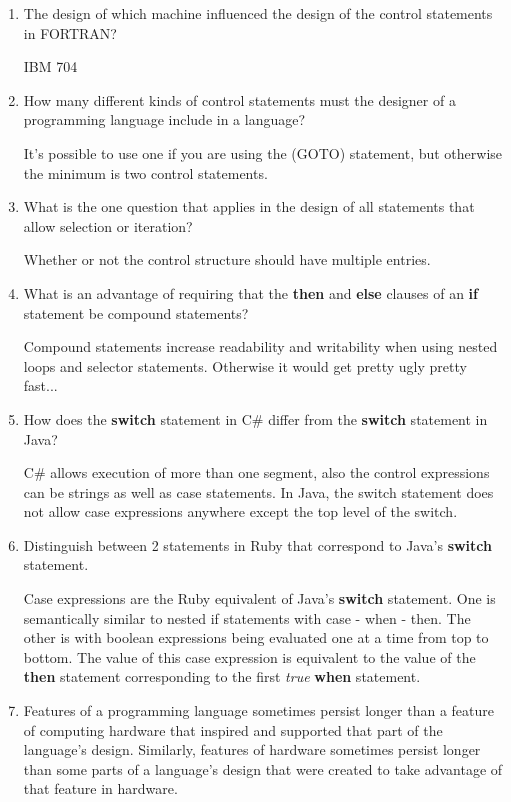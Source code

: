 \begin{enumerate}
  \item The design of which machine influenced the design
    of the control statements in FORTRAN?
    
    IBM 704

  \item How many different kinds of control statements
    must the designer of a programming language include
    in a language?
    
    It's possible to use one if you are using the (GOTO) statement, but otherwise the minimum is two control statements. 

  \item What is the one question that applies in the
    design of all statements that allow selection or
    iteration?
    
    Whether or not the control structure should have multiple entries.

  \item What is an advantage of requiring that
    the \textbf{then} and \textbf{else} clauses of
    an \textbf{if} statement be compound statements?
    
    Compound statements increase readability and writability when using nested loops and selector statements. Otherwise it would get pretty ugly pretty fast...

  \item How does the \textbf{switch} statement in C\#
    differ from the \textbf{switch} statement in Java?
    
    C\# allows execution of more than one segment, also the control expressions can be strings as well as case statements. In Java, the switch statement does not allow case expressions anywhere except the top level of the switch.

  \item Distinguish between 2 statements in Ruby
    that correspond to Java's \textbf{switch} statement.
    
    Case expressions are the Ruby equivalent of Java's \textbf{switch} statement. One is semantically similar to nested if statements with case - when - then. The other is with boolean expressions being evaluated one at a time from top to bottom. The value of this case expression is equivalent to the value of the \textbf{then} statement corresponding to the first \textit{true} \textbf{when} statement. 

  \item Features of a programming language sometimes persist
    longer than a feature of computing hardware that inspired
    and supported that part of the language's design.
    Similarly, features of hardware sometimes persist longer
    than some parts of a language's design that were created
    to take advantage of that feature in hardware.
    

\end{enumerate}
